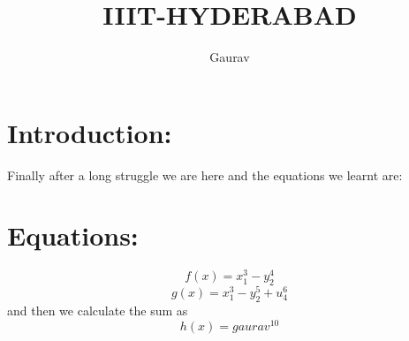 \documentclass{article}
\title{IIIT-HYDERABAD}
\begin{document}
\author{Gaurav}
\newpage
\maketitle
\newpage
\tableofcontents
\newpage
\section{Introduction:}
Finally after a long struggle we are here and the equations we learnt are:
\section{Equations:}
\begin{equation}
f(x) = x^3_1 - y_2^4
\end{equation}
\begin{equation}
g(x) = x^3_1 - y_2^5 + u_4^6
\end{equation}
and then we calculate the sum as \[h(x)=gaurav^{10}\]
\end{document}
